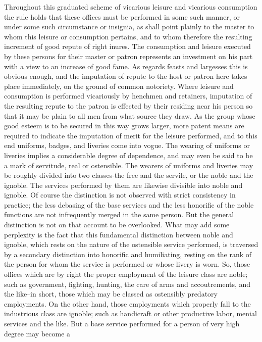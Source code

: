 \documentclass[12pt]{report}
\begin{document}
Throughout this graduated scheme of vicarious leisure and vicarious
consumption the rule holds that these offices must be performed in some
such manner, or under some such circumstance or insignia, as shall point
plainly to the master to whom this leisure or consumption pertains,
and to whom therefore the resulting increment of good repute of right
inures. The consumption and leisure executed by these persons for their
master or patron represents an investment on his part with a view to an
increase of good fame. As regards feasts and largesses this is obvious
enough, and the imputation of repute to the host or patron here takes
place immediately, on the ground of common notoriety. Where leisure
and consumption is performed vicariously by henchmen and retainers,
imputation of the resulting repute to the patron is effected by their
residing near his person so that it may be plain to all men from what
source they draw. As the group whose good esteem is to be secured in
this way grows larger, more patent means are required to indicate the
imputation of merit for the leisure performed, and to this end uniforms,
badges, and liveries come into vogue. The wearing of uniforms or
liveries implies a considerable degree of dependence, and may even
be said to be a mark of servitude, real or ostensible. The wearers of
uniforms and liveries may be roughly divided into two classes-the free
and the servile, or the noble and the ignoble. The services performed
by them are likewise divisible into noble and ignoble. Of course the
distinction is not observed with strict consistency in practice; the
less debasing of the base services and the less honorific of the noble
functions are not infrequently merged in the same person. But the
general distinction is not on that account to be overlooked. What
may add some perplexity is the fact that this fundamental distinction
between noble and ignoble, which rests on the nature of the ostensible
service performed, is traversed by a secondary distinction into
honorific and humiliating, resting on the rank of the person for whom
the service is performed or whose livery is worn. So, those offices
which are by right the proper employment of the leisure class are
noble; such as government, fighting, hunting, the care of arms and
accoutrements, and the like--in short, those which may be classed as
ostensibly predatory employments. On the other hand, those employments
which properly fall to the industrious class are ignoble; such as
handicraft or other productive labor, menial services and the like. But
a base service performed for a person of very high degree may become a
\end{document}
